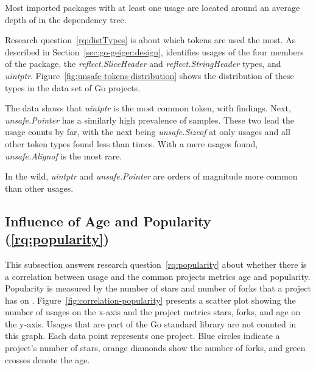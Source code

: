 \begin{answerToRQ}[\ref{rq:depsDepth}]
    Most imported packages with at least one \unsafe{} usage are located around an average depth of
    \averageUnsafeImportDepthRounded{} in the dependency tree.
\end{answerToRQ}

Research question~\ref{rq:distTypes} is about which \unsafe{} tokens are used the most.
As described in Section~\ref{sec:go-geiger:design}, \toolGeiger{} identifies usages of the four members of the \unsafe{}
package, the \textit{reflect.SliceHeader} and \textit{reflect.StringHeader} types, and \textit{uintptr}.
Figure~\ref{fig:unsafe-tokens-distribution} shows the distribution of these \unsafe{} types in the data set of Go
projects.



The data shows that \textit{uintptr} is the most common \unsafe{} token, with  findings.
Next, \textit{unsafe.Pointer} has a similarly high prevalence of  samples.
These two lead the usage counts by far, with the next being \textit{unsafe.Sizeof} at only  usages and
all other token types found less than  times.
With a mere  usages found, \textit{unsafe.Alignof} is the most rare.

\begin{answerToRQ}[\ref{rq:distTypes}]
    In the wild, \textit{uintptr} and \textit{unsafe.Pointer} are orders of magnitude more common than other \unsafe{}
    usages.
\end{answerToRQ}



\subsection{Influence of Age and Popularity (\ref{rq:popularity})}\label{subsec:go-geiger:evaluation:popularity}

This subsection answers research question~\ref{rq:popularity} about whether there is a correlation between \unsafe{}
usage and the common projects metrics age and popularity.
Popularity is measured by the number of stars and number of forks that a project has on \github{}.
Figure~\ref{fig:correlation-popularity} presents a scatter plot showing the number of \unsafe{} usages on the x-axis and
the project metrics stars, forks, and age on the y-axis.
Usages that are part of the Go standard library are not counted in this graph.
Each data point represents one project.
Blue circles indicate a project's number of stars, orange diamonds show the number of forks, and green crosses denote
the age.

